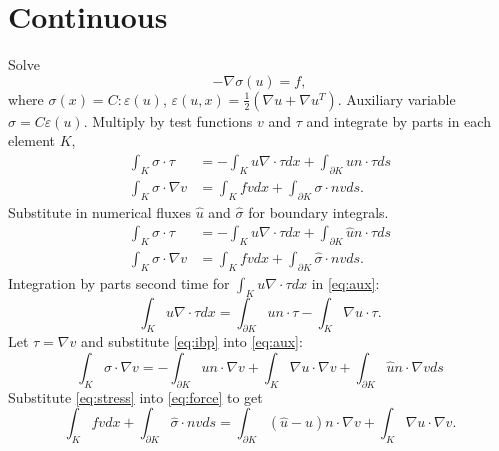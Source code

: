 \documentclass{article}
\begin{document}
\section{Continuous}
	Solve
	\[
	-\nabla\sigma(u) = f,
	\]
	where $\sigma(x) = C:\varepsilon(u)$, 
		  $\varepsilon(u,x) = \frac{1}{2}(\nabla u + \nabla u^T)$.
	Auxiliary variable $\sigma = C\varepsilon(u)$.
	Multiply by test functions $v$ and $\tau$ and integrate by parts in each element $K$,
	\begin{align}
	\int_K \sigma \cdot \tau&=-\int_Ku\nabla\cdot \tau dx +\int_{\partial K}u n\cdot \tau ds\\
	\int_K \sigma \cdot \nabla v&=\int_K fv dx +\int_{\partial K}\sigma \cdot n v ds.
	\end{align}
	Substitute in numerical fluxes $\hat{u}$ and $\hat{\sigma}$ for boundary integrals.
	\begin{align}
	\int_K \sigma \cdot \tau&=-\int_Ku\nabla\cdot \tau dx +\int_{\partial K}\hat{u} n\cdot \tau ds \label{eq:aux}\\
	\int_K \sigma \cdot \nabla v&=\int_K fv dx +\int_{\partial K}\hat{\sigma} \cdot n v ds.
		\label{eq:force}
	\end{align}
	Integration by parts second time for $\int_Ku\nabla\cdot \tau dx$ in \autoref{eq:aux}:
	\begin{equation}
	\int_Ku\nabla\cdot \tau dx=\int_{\partial K}u n\cdot \tau-\int_K\nabla u\cdot \tau.
	\label{eq:ibp}
	\end{equation}
	Let $\tau=\nabla v$ and substitute \autoref{eq:ibp} into \autoref{eq:aux}:
	\begin{equation}
	\int_K \sigma \cdot \nabla v = -\int_{\partial K}u n\cdot \nabla v+\int_K\nabla u\cdot \nabla v +\int_{\partial K}\hat{u} n\cdot \nabla v ds 
	\label{eq:stress}
	\end{equation}
	Substitute \autoref{eq:stress} into \autoref{eq:force} to get
	\begin{equation}
	\int_K fvdx + \int_{\partial K}\hat{\sigma}\cdot nvds 
	= \int_{\partial K}(\hat{u}-u) n\cdot \nabla v+\int_K\nabla u\cdot \nabla v.
	\end{equation}
		
\end{document}
